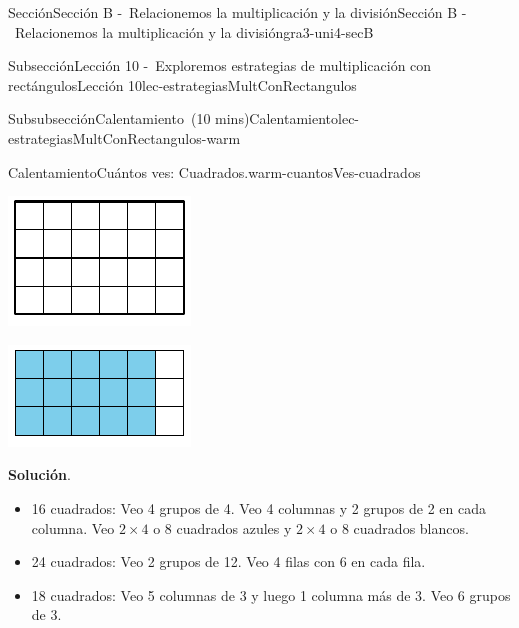 \documentclass[oneside,10pt,]{article}
\newcommand{\blocktitlefont}{\relax}
\begin{document}
\begin{sectionptx}{Sección}{Sección B -~Relacionemos la multiplicación y la división}{}{Sección B -~Relacionemos la multiplicación y la división}{}{}{gra3-uni4-secB}
\begin{subsectionptx}{Subsección}{Lección 10 -~Exploremos estrategias de multiplicación con rectángulos}{}{Lección 10}{}{}{lec-estrategiasMultConRectangulos}
\begin{subsubsectionptx}{Subsubsección}{Calentamiento~(10 mins)}{}{Calentamiento}{}{}{lec-estrategiasMultConRectangulos-warm}
\begin{exploration}{Calentamiento}{Cuántos ves: Cuadrados.}{warm-cuantosVes-cuadrados}
\begin{sidebyside}{3}{0}{0}{0.05}
\begin{sbspanel}{0.3}
\includegraphics[width=\linewidth]{external/svg-source/tikz-file-141805.pdf}
\end{sbspanel}%
\begin{sbspanel}{0.3}%
\includegraphics[width=\linewidth]{external/svg-source/tikz-file-147478.pdf}
\end{sbspanel}%
\end{sidebyside}%
\par\smallskip%
\noindent\textbf{\blocktitlefont Solución}.\hypertarget{warm-cuantosVes-cuadrados-3}{}\quad{}%
\begin{itemize}[label=\textbullet]
\item{}16 cuadrados: Veo 4 grupos de 4. Veo 4 columnas y 2 grupos de 2 en cada columna. Veo \(2 \times 4\) o 8 cuadrados azules y \(2 \times 4\) o 8 cuadrados blancos.%
\item{}24 cuadrados: Veo 2 grupos de 12. Veo 4 filas con 6 en cada fila.%
\item{}18 cuadrados: Veo 5 columnas de 3 y luego 1 columna más de 3. Veo 6 grupos de 3.%

\end{itemize}
\end{exploration}
\end{subsubsectionptx}
\end{subsectionptx}
\end{sectionptx}
\end{document}
